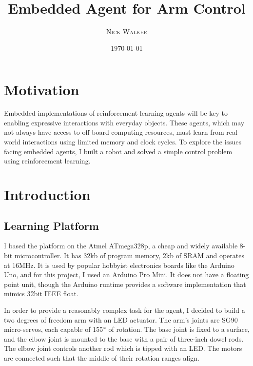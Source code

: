 \documentclass{article}
\title{Embedded Agent for Arm Control} %
\author{\textsc{Nick Walker}} %
\date{\today} %
\begin{document}
	
	\maketitle %
	
	
	
	\section{Motivation}
	
	Embedded implementations of reinforcement learning agents will be key to enabling expressive interactions with everyday objects. These agents, which may not always have access to off-board computing resources, must learn from real-world interactions using limited memory and clock cycles. To explore the issues facing embedded agents, I built a robot and solved a simple control problem using reinforcement learning.
	
	
	
	\section{Introduction}
	
	\subsection{Learning Platform}
	
	I based the platform on the Atmel ATmega328p, a cheap and widely available 8-bit microcontroller. It has 32kb of program memory, 2kb of SRAM and operates at 16MHz. It is used by popular hobbyist electronics boards like the Arduino Uno, and for this project, I used an Arduino Pro Mini. It does not have a floating point unit, though the Arduino runtime provides a software implementation that mimics 32bit IEEE float.
	
	In order to provide a reasonably complex task for the agent, I decided to build a two degrees of freedom arm with an LED actuator. The arm's joints are SG90 micro-servos, each capable of 155$\degree$ of rotation. The base joint is fixed to a surface, and the elbow joint is mounted to the base with a pair of three-inch dowel rods. The elbow joint controls another rod which is tipped with an LED. The motors are connected such that the middle of their rotation ranges align.
	
\end{document}
